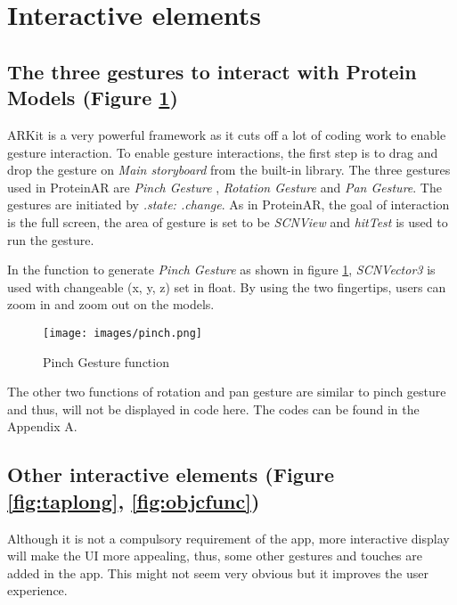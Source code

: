 \section{Interactive elements}
\subsection{The three gestures to interact with Protein Models (Figure \ref{fig:pinch})}
ARKit is a very powerful framework as it cuts off a lot of coding work to enable gesture interaction. To enable gesture interactions, the first step is to drag and drop the gesture on \emph{Main storyboard} from the built-in library. The three gestures used in ProteinAR are \emph{Pinch Gesture} , \emph{Rotation Gesture} and \emph{Pan Gesture}. The gestures are initiated by \emph{.state: .change}. As in ProteinAR, the goal of interaction is the full screen, the area of gesture is set to be \emph{SCNView} and \emph{hitTest} is used to run the gesture. 

In the function to generate \emph{Pinch Gesture} as shown in figure \ref{fig:pinch}, \emph{SCNVector3} is used with changeable (x, y, z) set in float. By using the two fingertips, users can zoom in and zoom out on the models. 
\begin{figure}[!htp]
	\centering
	\texttt{[image: images/pinch.png]}
	\caption{Pinch Gesture function}
	\label{fig:pinch}
\end{figure}
The other two functions of rotation and pan gesture are similar to pinch gesture and thus, will not be displayed in code here. The codes can be found in the Appendix A. 

\subsection{Other interactive elements (Figure \ref{fig:taplong}, \ref{fig:objcfunc})}
Although it is not a compulsory requirement of the app, more interactive display will make the UI more appealing, thus, some other gestures and touches are added in the app. This might not seem very obvious but it improves the user experience.
